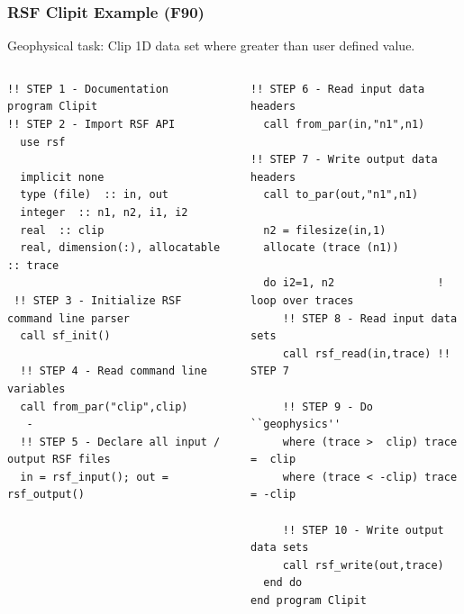\begin{frame}[ label=part1,fragile]
\frametitle{RSF Clipit Example (F90) }

Geophysical task: Clip 1D data set where greater than user defined value.


\begin{columns}
\begin{column}{0.5\textwidth}
\begin{lstlisting}
!! STEP 1 - Documentation
program Clipit	
!! STEP 2 - Import RSF API
  use rsf  
  
  implicit none
  type (file)  :: in, out
  integer  :: n1, n2, i1, i2
  real  :: clip
  real, dimension(:), allocatable :: trace
 
 !! STEP 3 - Initialize RSF command line parser
  call sf_init()        
  
  !! STEP 4 - Read command line variables
  call from_par("clip",clip)
   - 
  !! STEP 5 - Declare all input / output RSF files
  in = rsf_input(); out = rsf_output()

\end{lstlisting}

\end{column}

\begin{column}{0.5\textwidth}
\begin{lstlisting}  
!! STEP 6 - Read input data headers
  call from_par(in,"n1",n1)
  
!! STEP 7 - Write output data headers
  call to_par(out,"n1",n1)
  
  n2 = filesize(in,1)
  allocate (trace (n1))
 
  do i2=1, n2                ! loop over traces
     !! STEP 8 - Read input data sets
     call rsf_read(in,trace) !! STEP 7

     !! STEP 9 - Do ``geophysics''
     where (trace >  clip) trace =  clip
     where (trace < -clip) trace = -clip

     !! STEP 10 - Write output  data sets
     call rsf_write(out,trace)
  end do
end program Clipit
\end{lstlisting}

\end{column}

\end{columns}
\end{frame}
 

